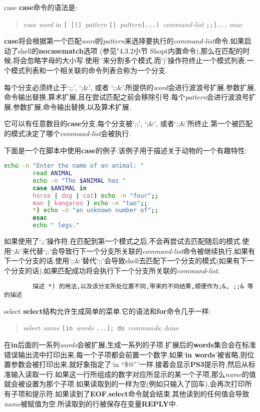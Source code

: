 \documentclass[draft,openany]{book}
\begin{document}
\begin{CJK}{UTF8}{gbsn}
\begin{basedescript}{\desclabelstyle{\nextlinelabel}\desclabelwidth{2.5em}}
    \item[case] \textbf{case}命令的语法是:
        \begin{quote}
            case \emph{word} in \verb+[ [(] +\emph{pattern} \verb+[| +\emph{pattern}\verb+]...) +\emph{command-list} \verb+;;]...+ esac
        \end{quote}
        \textbf{case}将会根据第一个匹配\emph{word}的\emph{pattern}来选择要执行的\emph{command-list}命令.如果启动了shell的\textbf{nocasematch}选项 (参见"4.3.2小节 Shopt内置命令),那么在匹配的时候,将会忽略字母的大小写.使用`\textbar'来分割多个模式,而`)'操作符终止一个模式列表.一个模式列表和一个相关联的命令列表合称为一个分支.\par
        每个分支必须终止于`;;', `;\&', 或者 `;;\&'.所提供的\emph{word}会进行波浪号扩展,参数扩展,命令输出替换,算术扩展,且在尝试匹配之前会移除引号.每个\emph{pattern}会进行波浪号扩展,参数扩展,命令输出替换,以及算术扩展.\par
        它可以有任意数目的\textbf{case}分支,每个分支被`;;', `;\&', 或者`;;\&'所终止.第一个被匹配的模式决定了哪个\emph{command-list}会被执行.\par
        下面是一个在脚本中使用\textbf{case}的例子.该例子用于描述关于动物的一个有趣特性:
        \begin{lstlisting}[language=bash]
        echo -n "Enter the name of an animal: "
        read ANIMAL
        echo -n "The $ANIMAL has "
        case $ANIMAL in
        horse | dog | cat) echo -n "four";;
        man | kangaroo ) echo -n "two";;
        *) echo -n "an unknown number of";;
        esac
        echo " legs."
        \end{lstlisting}
        如果使用了`;;'操作符,在匹配到第一个模式之后,不会再尝试去匹配随后的模式.使用`;\&'来代替`;;'会导致行下一个分支所关联的\emph{command-list}命令被继续执行,如果有下一个分支的话.使用`;;\&'替代`;;'会导致shell去匹配下一个分支的模式(如果有下一个分支的话),如果匹配成功将会执行下一个分支所关联的\emph{command-list}.
        \begin{verbatim}
        描述 *) 的用法,以及该分支所处位置不同,带来的不同结果,顺便作为;&, ;;& 等的描述
        \end{verbatim}
    \item[select] \textbf{select}结构允许生成简单的菜单.它的语法和\textbf{for}命令几乎一样:
        \begin{quote}
            select \emph{name} \verb+[in +\emph{words} \verb+...]; do +\emph{commands}; done
        \end{quote}
        在\textbf{in}后面的一系列\emph{words}会被扩展,生成一系列的子项.扩展后的\textbf{words}集合会在标准错误输出流中打印出来,每一个子项都会前置一个数字.如果`\textbf{in words}'被省略,则位置参数会被打印出来,就好象指定了`in ``\$@'''一样.接着会显示\textbf{PS3}提示符,然后从标准输入读取一行.如果这一行所组成的数字对应所显示的某一个子项,那么\emph{name}的值就会被设置为那个子项.如果读取到的一样为空(例如只输入了回车),会再次打印所有子项和提示符.如果读到了\textbf{EOF},\textbf{select}命令就会结束.其他读到的任何值会导致\emph{name}被赋值为空.所读取到的行被保存在变量\textbf{REPLY}中.\par

\end{basedescript}
\end{CJK}
\end{document}
